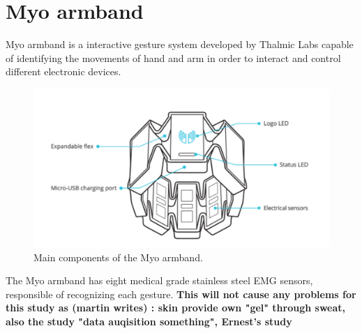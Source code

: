 \section{Myo armband}

Myo armband is a interactive gesture system developed by Thalmic Labs capable of identifying the movements of hand and arm in order to interact and control different electronic devices.

\begin{figure}[H]                    
	\includegraphics[width=.5\textwidth]{figures/myob/armband}  %
	\caption{Main components of the Myo armband. \cite{}}
	\label{fig:armband}  %
\end{figure}



The Myo armband has eight medical grade stainless steel EMG sensors, responsible of recognizing each gesture. \textbf{This will not cause any problems for this study as (martin writes) : skin provide own "gel" through sweat, also the study "data auqisition something", Ernest's study }

